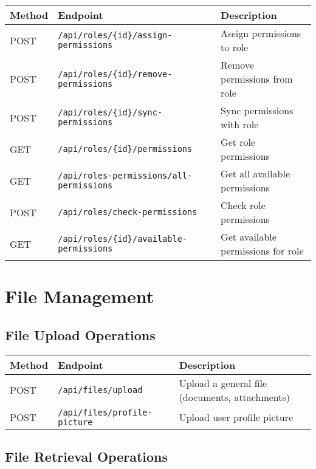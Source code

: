 \documentclass[12pt,a4paper]{article}
\begin{document}
\begin{longtable}{|p{}|p{}|p{}|}
\hline
\textbf{Method} & \textbf{Endpoint} & \textbf{Description} \\
\hline
\endhead

POST & \texttt{/api/roles/\{id\}/assign-permissions} & Assign permissions to role \\
POST & \texttt{/api/roles/\{id\}/remove-permissions} & Remove permissions from role \\
POST & \texttt{/api/roles/\{id\}/sync-permissions} & Sync permissions with role \\
GET & \texttt{/api/roles/\{id\}/permissions} & Get role permissions \\
GET & \texttt{/api/roles-permissions/all-permissions} & Get all available permissions \\
POST & \texttt{/api/roles/check-permissions} & Check role permissions \\
GET & \texttt{/api/roles/\{id\}/available-permissions} & Get available permissions for role \\
\hline
\end{longtable}

\section{File Management}

\subsection{File Upload Operations}

\begin{longtable}{|p{}|p{}|p{}|}
\hline
\textbf{Method} & \textbf{Endpoint} & \textbf{Description} \\
\hline
\endhead

POST & \texttt{/api/files/upload} & Upload a general file (documents, attachments) \\
POST & \texttt{/api/files/profile-picture} & Upload user profile picture \\
\hline
\end{longtable}

\subsection{File Retrieval Operations}
\end{document}
